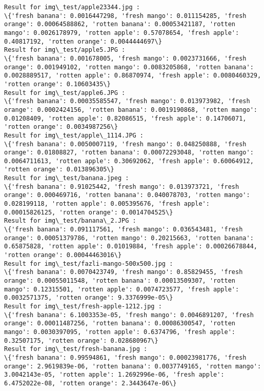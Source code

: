\documentclass[11pt]{article}
\begin{document}
    \begin{Verbatim}[commandchars=\\\{\}]
Result for img\_test/apple23344.jpg :
\{'fresh banana': 0.0016447298, 'fresh mango': 0.011154285, 'fresh orange': 0.00064588862, 'rotten banana': 0.00053421187, 'rotten mango': 0.0026178979, 'rotten apple': 0.57078654, 'fresh apple': 0.40817192, 'rotten orange': 0.0044444697\}
Result for img\_test/apple5.JPG :
\{'fresh banana': 0.001678005, 'fresh mango': 0.0023731666, 'fresh orange': 0.001949102, 'rotten mango': 0.0083205868, 'rotten banana': 0.0028889517, 'rotten apple': 0.86870974, 'fresh apple': 0.0080460329, 'rotten orange': 0.10603435\}
Result for img\_test/apple6.JPG :
\{'fresh banana': 0.00035585547, 'fresh mango': 0.013973982, 'fresh orange': 0.0002424156, 'rotten banana': 0.0019190868, 'rotten mango': 0.01208409, 'rotten apple': 0.82086515, 'fresh apple': 0.14706071, 'rotten orange': 0.0034987256\}
Result for img\_test/apple\_1114.JPG :
\{'fresh banana': 0.0050007119, 'fresh mango': 0.048250888, 'fresh orange': 0.01808827, 'rotten banana': 0.00072293048, 'rotten mango': 0.0064711613, 'rotten apple': 0.30692062, 'fresh apple': 0.60064912, 'rotten orange': 0.013896305\}
Result for img\_test/banana.jpeg :
\{'fresh banana': 0.91025442, 'fresh mango': 0.013973721, 'fresh orange': 0.000469716, 'rotten banana': 0.040078703, 'rotten mango': 0.028199118, 'rotten apple': 0.005395676, 'fresh apple': 0.00015826125, 'rotten orange': 0.0014704525\}
Result for img\_test/banana\_2.JPG :
\{'fresh banana': 0.091117561, 'fresh mango': 0.036543481, 'fresh orange': 0.00051379786, 'rotten mango': 0.20215663, 'rotten banana': 0.65875828, 'rotten apple': 0.01019884, 'fresh apple': 0.00026678844, 'rotten orange': 0.00044463016\}
Result for img\_test/fazli-mango-500x500.jpg :
\{'fresh banana': 0.0070423749, 'fresh mango': 0.85829455, 'fresh orange': 0.00055011548, 'rotten banana': 0.00013509307, 'rotten mango': 0.12315501, 'rotten apple': 0.0074723577, 'fresh apple': 0.0032571375, 'rotten orange': 9.3376999e-05\}
Result for img\_test/fresh-apple-1212.jpg :
\{'fresh banana': 6.1003353e-05, 'fresh mango': 0.0046891207, 'fresh orange': 0.00011487256, 'rotten banana': 0.00086300547, 'rotten mango': 0.0030397095, 'rotten apple': 0.6374796, 'fresh apple': 0.32507175, 'rotten orange': 0.028680967\}
Result for img\_test/fresh-banana.jpg :
\{'fresh banana': 0.99594861, 'fresh mango': 0.00023981776, 'fresh orange': 2.9619839e-06, 'rotten banana': 0.0037749165, 'rotten mango': 3.0042143e-05, 'rotten apple': 1.2692996e-06, 'fresh apple': 6.4752022e-08, 'rotten orange': 2.3443647e-06\}

\end{Verbatim}
\end{document}
